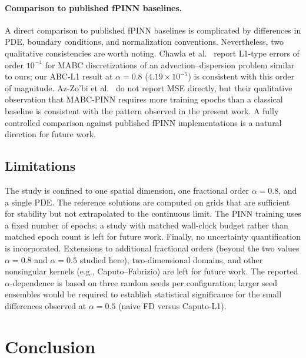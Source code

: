 \documentclass[11pt]{article}
\begin{document}
\paragraph{Comparison to published fPINN baselines.}
A direct comparison to published fPINN baselines is complicated by
differences in PDE, boundary conditions, and normalization conventions.
Nevertheless, two qualitative consistencies are worth noting.
Chawla et al.~\cite{Chawla2022} report L1-type errors of order
\(10^{-4}\) for MABC discretizations of an advection--dispersion problem
similar to ours; our ABC-L1 result at \(\alpha=0.8\)
(\(4.19\times 10^{-5}\)) is consistent with this order of magnitude.
Az-Zo'bi et al.~\cite{AzZobi2025} do not report MSE directly, but their
qualitative observation that MABC-PINN requires more training epochs
than a classical baseline is consistent with the pattern observed in
the present work. A fully controlled comparison against published
fPINN implementations is a natural direction for future work.

\subsection{Limitations}
\label{sec:limitations}

The study is confined to one spatial dimension, one fractional order \(\alpha=0.8\), and a single PDE. The reference solutions are computed on grids that are sufficient for stability but not extrapolated to the continuous limit. The PINN training uses a fixed number of epochs; a study with matched wall-clock budget rather than matched epoch count is left for future work. Finally, no uncertainty quantification is incorporated. Extensions to additional fractional orders (beyond the two
values \(\alpha=0.8\) and \(\alpha=0.5\) studied here), two-dimensional domains, and other nonsingular
kernels (e.g., Caputo--Fabrizio) are left for future work. The reported
\(\alpha\)-dependence is based on three random seeds per configuration;
larger seed ensembles would be required to establish statistical
significance for the small differences observed at \(\alpha=0.5\)
(naive FD versus Caputo-L1).

\section{Conclusion}
\label{sec:conclusion}
\end{document}
